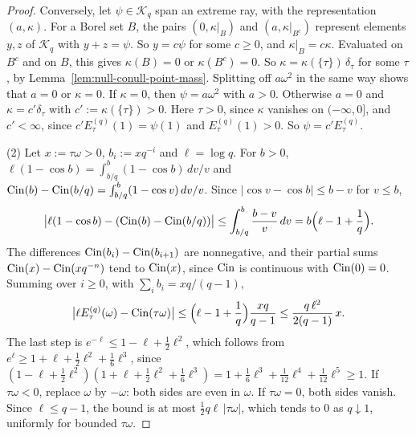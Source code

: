 \begin{proof}
Conversely, let $\psi \in \mathcal{K}_q$ span an extreme ray, with the representation $(a, \kappa)$.
For a Borel set $B$, the pairs $(0, \kappa|_B)$ and $(a, \kappa|_{B^c})$ represent elements $y, z$
of $\mathcal{K}_q$ with $y + z = \psi$. So $y = c\psi$ for some $c \ge 0$, and $\kappa|_B = c\kappa$.
Evaluated on $B^c$ and on $B$, this gives $\kappa(B) = 0$ or $\kappa(B^c) = 0$. So
$\kappa = \kappa(\{\tau\})\,\delta_\tau$ for some $\tau$, by
Lemma~\ref{lem:null-conull-point-mass}. Splitting off $a\omega^2$ in the same way shows that
$a = 0$ or $\kappa = 0$. If $\kappa = 0$, then $\psi = a\omega^2$ with $a > 0$. Otherwise $a = 0$ and
$\kappa = c'\delta_\tau$ with $c' := \kappa(\{\tau\}) > 0$. Here $\tau > 0$, since $\kappa$ vanishes on
$(-\infty,0]$, and $c' < \infty$, since $c'E^{(q)}_\tau(1) = \psi(1)$ and $E^{(q)}_\tau(1) > 0$. So
$\psi = c'E^{(q)}_\tau$.

(2) Let $x := \tau\omega > 0$, $b_i := xq^{-i}$ and $\ell = \log q$. For $b > 0$,
$\ell(1 - \cos b) = \int_{b/q}^b(1 - \cos b)\,dv/v$ and
$\operatorname{Cin}(b) - \operatorname{Cin}(b/q) = \int_{b/q}^b(1 - \cos v)\,dv/v$. Since $|\cos v - \cos b| \le b - v$ for
$v \le b$,
\[
  \bigl|\ell(1 - \cos b) - (\operatorname{Cin}(b) - \operatorname{Cin}(b/q))\bigr| \le \int_{b/q}^b\frac{b - v}{v}\,dv
  = b\Bigl(\ell - 1 + \frac1q\Bigr).
\]
The differences $\operatorname{Cin}(b_i) - \operatorname{Cin}(b_{i+1})$ are nonnegative, and their partial sums
$\operatorname{Cin}(x) - \operatorname{Cin}(xq^{-n})$ tend to $\operatorname{Cin}(x)$, since $\operatorname{Cin}$ is continuous with $\operatorname{Cin}(0) = 0$. Summing
over $i \ge 0$, with $\sum_ib_i = xq/(q - 1)$,
\[
  \bigl|\ell E^{(q)}_\tau(\omega) - \operatorname{Cin}(\tau\omega)\bigr|
  \le \Bigl(\ell - 1 + \frac1q\Bigr)\frac{xq}{q - 1} \le \frac{q\,\ell^2}{2(q - 1)}\,x .
\]
The last step is $e^{-\ell} \le 1 - \ell + \tfrac12\ell^2$, which follows from
$e^\ell \ge 1 + \ell + \tfrac12\ell^2 + \tfrac16\ell^3$, since
$(1 - \ell + \tfrac12\ell^2)(1 + \ell + \tfrac12\ell^2 + \tfrac16\ell^3)
= 1 + \tfrac16\ell^3 + \tfrac1{12}\ell^4 + \tfrac1{12}\ell^5 \ge 1$. If $\tau\omega < 0$, replace
$\omega$ by $-\omega$: both sides are even in $\omega$. If $\tau\omega = 0$, both sides vanish. Since
$\ell \le q - 1$, the bound is at most $\tfrac12q\ell\,|\tau\omega|$, which tends to $0$ as
$q \downarrow 1$, uniformly for bounded $\tau\omega$.


\end{proof}
